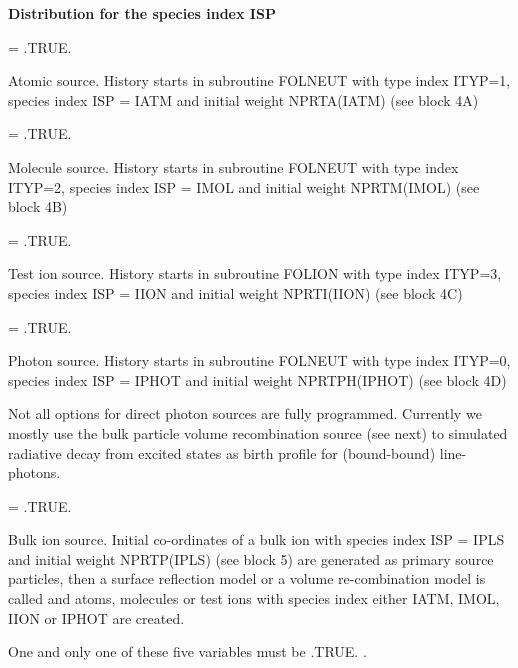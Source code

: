 \medskip

\noindent

{\bf Distribution for the species index ISP}

\medskip

\noindent

\begin{list}{ }{}
\item[{\bf NLATM }]
= .TRUE.

Atomic source. History starts in subroutine FOLNEUT with
type index ITYP=1, species index
ISP = IATM and initial weight NPRTA(IATM) (see block 4A)
\item[{\bf NLMOL }]
= .TRUE.

Molecule source. History starts in subroutine FOLNEUT with type
index ITYP=2, species
index ISP = IMOL and initial weight NPRTM(IMOL) (see block 4B)
\item[{\bf NLION }]
= .TRUE.

Test ion source. History starts in subroutine FOLION with type index
ITYP=3, species
index ISP = IION and initial weight NPRTI(IION) (see block 4C)
\item[{\bf NLPHOT }]
= .TRUE.

Photon source. History starts in subroutine FOLNEUT with type index
ITYP=0, species
index ISP = IPHOT and initial weight NPRTPH(IPHOT) (see block 4D)

Not all options for direct photon sources are fully programmed. Currently
we mostly use the bulk particle volume recombination source (see next) to
simulated radiative decay from excited states as birth profile for (bound-bound)
line-photons.

\item[{\bf NLPLS }]
= .TRUE.

Bulk ion source. Initial co-ordinates of a bulk ion with species
index ISP = IPLS and initial weight NPRTP(IPLS) (see block 5)
are generated as primary source particles,
then a surface reflection model or a volume re-combination
model is called and atoms, molecules or test ions with species index
either IATM, IMOL, IION or IPHOT
are created.
\end{list}

One and only one of these five variables must be .TRUE. .

